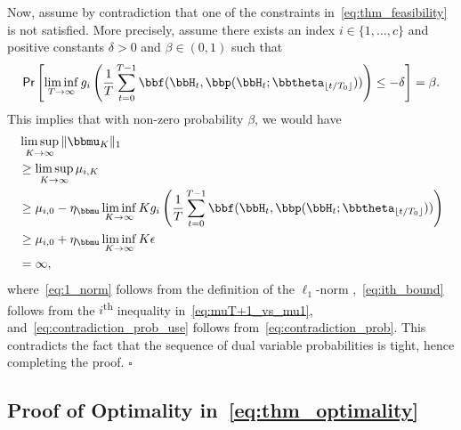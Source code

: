 Now, assume by contradiction that one of the constraints in~\eqref{eq:thm_feasibility} is not satisfied. More precisely, assume there exists an index $i\in\{1,\dots,c\}$ and positive constants $\delta>0$ and $\beta\in(0,1)$ such that
\begin{align}\label{eq:contradiction_prob}
\mathsf{Pr}\left[\liminf_{T\to\infty} g_i\left( \frac{1}{T} \sum_{t=0}^{T-1} \bbf(\bbH_t, \bbp(\bbH_t;\bbtheta_{\lfloor t/T_0 \rfloor})) \right) \leq -\delta \right] = \beta.
\end{align}
This implies that with non-zero probability $\beta$, we would have
\begin{align}
&\limsup_{K\to\infty} \|\bbmu_{K}\|_1 \nonumber \\
&\geq \limsup_{K\to\infty} \mu_{i,K}\label{eq:1_norm} \\
&\geq \mu_{i,0} - \eta_{\bbmu} \liminf_{K\to\infty} K g_i\left( \frac{1}{T} \sum_{t=0}^{T-1} \bbf(\bbH_t, \bbp(\bbH_t;\bbtheta_{\lfloor t/T_0 \rfloor})) \right)\label{eq:ith_bound} \\
&\geq \mu_{i,0} + \eta_{\bbmu} \liminf_{K\to\infty} K \epsilon \label{eq:contradiction_prob_use} \\
&= \infty,
\end{align}
where~\eqref{eq:1_norm} follows from the definition of the $\ell_1$-norm%
,~\eqref{eq:ith_bound} follows from the $i$\textsuperscript{th} inequality in~\eqref{eq:muT+1_vs_mu1}, and~\eqref{eq:contradiction_prob_use} follows from~\eqref{eq:contradiction_prob}. This contradicts the fact that the sequence of dual variable probabilities is tight, hence completing the proof.
\hfill$\square$


\subsection{Proof of Optimality in~\eqref{eq:thm_optimality}}


